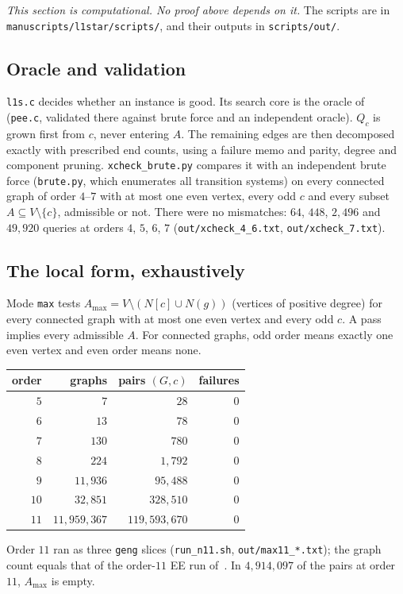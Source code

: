 \documentclass[11pt]{amsart}
\theoremstyle{definition}
\begin{document}
\emph{This section is computational. No proof above depends on it.} The scripts are in
\nolinkurl{manuscripts/l1star/scripts/}, and their outputs in \nolinkurl{scripts/out/}.

\subsection*{Oracle and validation}
\texttt{l1s.c} decides whether an instance is good. Its search core is the oracle of~\cite{PE}
(\texttt{pee.c}, validated there against brute force and an independent oracle). $Q_c$ is grown first
from $c$, never entering $A$. The remaining edges are then decomposed exactly with prescribed end
counts, using a failure memo and parity, degree and component pruning. \texttt{xcheck\_brute.py}
compares it with an independent brute force (\texttt{brute.py}, which enumerates all transition
systems) on every connected graph of order $4$--$7$ with at most one even vertex, every odd $c$
and every subset $A\subseteq V\setminus\{c\}$, admissible or not. There were no mismatches: $64$,
$448$, $2{,}496$ and $49{,}920$ queries at orders $4$, $5$, $6$, $7$ (\texttt{out/xcheck\_4\_6.txt},
\texttt{out/xcheck\_7.txt}).

\subsection*{The local form, exhaustively}
Mode \texttt{max} tests $A_{\max}=V\setminus(N[c]\cup N(g))$ (vertices of positive degree) for every
connected graph with at most one even vertex and every odd $c$. A pass implies every admissible $A$.
For connected graphs, odd order means exactly one even vertex and even order means none.

\begin{center}
\begin{tabular}{rrrr}
\toprule
order & graphs & pairs $(G,c)$ & failures\\
\midrule
$5$ & $7$ & $28$ & $0$\\
$6$ & $13$ & $78$ & $0$\\
$7$ & $130$ & $780$ & $0$\\
$8$ & $224$ & $1{,}792$ & $0$\\
$9$ & $11{,}936$ & $95{,}488$ & $0$\\
$10$ & $32{,}851$ & $328{,}510$ & $0$\\
$11$ & $11{,}959{,}367$ & $119{,}593{,}670$ & $0$\\
\bottomrule
\end{tabular}
\end{center}
Order $11$ ran as three \texttt{geng} slices (\texttt{run\_n11.sh}, \texttt{out/max11\_*.txt}); the
graph count equals that of the order-$11$ EE run of~\cite{PE}. In $4{,}914{,}097$ of the pairs at
order $11$, $A_{\max}$ is empty.
\end{document}
